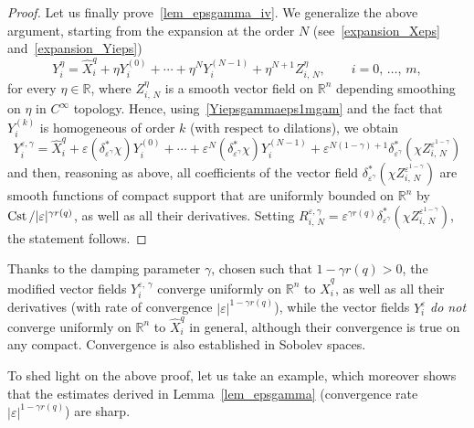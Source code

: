 \documentclass[AHL,Unicode,published]{cedram}
\newcommand*\R{\mathbb{R}}
\DeclareMathOperator{\Cst}{Cst}
\begin{document}
\begin{proof}
Let us finally prove~\eqref{lem_epsgamma_iv}. We generalize the above argument, starting from the expansion at the order $N$ (see~\eqref{expansion_Xeps} and~\eqref{expansion_Yieps})
\[
Y_i^\eta = \widehat{X}_i^{q} + \eta Y_i^{(0)} + \cdots + \eta^N Y_i^{(N-1)} + \eta^{N+1} Z_{i,\,N}^\eta,\qquad i=0,\,\ldots,\,m,
\]
for every $\eta\in\R$, where $Z_{i,\,N}^\eta$ is a smooth vector field on $\R^n$ depending smoothing on $\eta$ in $C^\infty$ topology. Hence, using~\eqref{Yiepsgammaeps1mgam} and the fact that $Y_i^{(k)}$ is homogeneous of order $k$ (with respect to dilations), we obtain
\[
Y_i^{\varepsilon,\gamma} = \widehat{X}_i^{q} + \varepsilon \left(\delta_{\varepsilon^\gamma}^* \chi\right) Y_i^{(0)} + \cdots + \varepsilon^N \left(\delta_{\varepsilon^\gamma}^* \chi\right) Y_i^{(N-1)} + \varepsilon^{N(1-\gamma)+1} \delta_{\varepsilon^\gamma}^* \left(\chi Z_{i,\,N}^{\varepsilon^{1-\gamma}} \right)
\]
and then, reasoning as above, all coefficients of the vector field $\delta_{\varepsilon^\gamma}^* (\chi Z_{i,\,N}^{\varepsilon^{1-\gamma}})$ are smooth functions of compact support that are uniformly bounded on $\R^n$ by $\Cst/\linebreak\vert\varepsilon\vert^{\gamma r(q)}$, as well as all their derivatives. Setting $R_{i,\,N}^{\varepsilon,\gamma} = \varepsilon^{\gamma r(q)} \delta_{\varepsilon^\gamma}^*(\chi Z_{i,\,N}^{\varepsilon^{1-\gamma}})$, the statement follows.
\end{proof}

Thanks to the damping parameter $\gamma$, chosen such that $1-\gamma r(q)>0$, the modified vector fields $Y^{\varepsilon,\,\gamma}_i$ converge uniformly on $\R^n$ to $\widehat{X}^{q}_i$, as well as all their derivatives (with rate of convergence $\vert\varepsilon\vert^{1-\gamma r(q)}$), while the vector fields $Y^\varepsilon_i$ \emph{do not} converge uniformly on $\R^n$ to $\widehat{X}^{q}_i$ in general, although their convergence is true on any compact. Convergence is also established in Sobolev spaces.

To shed light on the above proof, let us take an example, which moreover shows that the estimates derived in Lemma~\ref{lem_epsgamma} (convergence rate $\vert\varepsilon\vert^{1-\gamma r(q)}$) are sharp.
\end{document}
